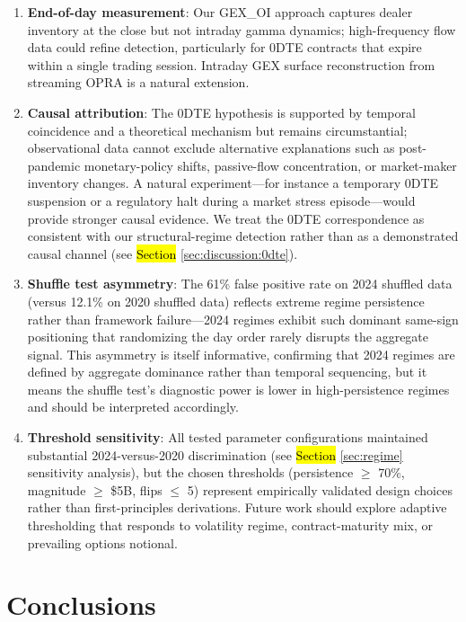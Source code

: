 \documentclass[jrfm,article,accept,moreauthors,pdftex]{Definitions/mdpi}
\begin{document}
\begin{enumerate}[leftmargin=*,labelsep=4.5mm]
\item \textbf{End-of-day measurement}: Our GEX\_OI approach captures
dealer inventory at the close but not intraday gamma dynamics; high-frequency
flow data could refine detection, particularly for 0DTE contracts that
expire within a single trading session. Intraday GEX surface reconstruction
from streaming OPRA is a natural extension.

\item \textbf{Causal attribution}: The 0DTE hypothesis is supported by
temporal coincidence and a theoretical mechanism but remains
circumstantial; observational data cannot exclude alternative explanations
such as post-pandemic monetary-policy shifts, passive-flow concentration,
or market-maker inventory changes. A natural experiment---for instance a
temporary 0DTE suspension or a regulatory halt during a market stress
episode---would provide stronger causal evidence. We treat the 0DTE
correspondence as consistent with our structural-regime detection rather
than as a demonstrated causal channel (see \hl{Section} \ref{sec:discussion:0dte}).

\item \textbf{Shuffle test asymmetry}: The 61\% false positive rate on
2024 shuffled data (versus 12.1\% on 2020 shuffled data) reflects extreme
regime persistence rather than framework failure---2024 regimes exhibit
such dominant same-sign positioning that randomizing the day order rarely
disrupts the aggregate signal. This asymmetry is itself informative,
confirming that 2024 regimes are defined by aggregate dominance rather
than temporal sequencing, but it means the shuffle test's diagnostic
power is lower in high-persistence regimes and should be interpreted
accordingly.

\item \textbf{Threshold sensitivity}: All tested parameter
configurations maintained substantial 2024-versus-2020 discrimination
(see \hl{Section} \ref{sec:regime} sensitivity analysis), but the chosen thresholds
(persistence $\geq$ 70\%, magnitude $\geq$ \$5B, flips $\leq$ 5) represent
empirically validated design choices rather than first-principles
derivations. Future work should explore adaptive thresholding that
responds to volatility regime, contract-maturity mix, or prevailing
options notional.
\end{enumerate}

\section{Conclusions}
\label{sec:conclusion}
\end{document}
